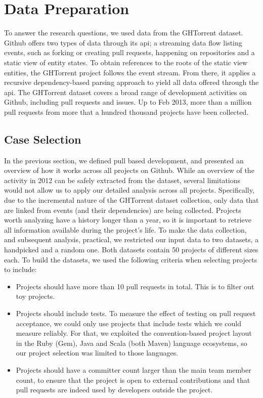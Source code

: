 \documentclass{sig-alternate}
\begin{document}
\section{Data Preparation}

To answer the research questions, we used data from the GHTorrent dataset.
Github offers two types of data through its {\sc api}; a streaming data flow
listing events, such as forking or creating pull requests, happening on
repositories and a static view of entity states. To obtain references to the
roots of the static view entities, the GHTorrent project follows the event
stream. From there, it applies a recursive dependency-based parsing approach to
yield all data offered through the {\sc api}. The GHTorrent dataset covers a
broad range of development activities on Github, including pull requests and
issues. Up to Feb 2013, more than a million pull requests from more that a
hundred thousand projects have been collected.

\subsection{Case Selection}
\label{sec:caseselection}
In the previous section, we defined pull based development, and presented an
overview of how it works across all projects on Github. While an overview of
the activity in 2012 can be safely extracted from the dataset, several
limitations would not allow us to apply our detailed analysis across all
projects. Specifically, due to the incremental nature of the GHTorrent dataset
collection, only data that are linked from events (and their dependencies) are
being collected. Projects worth analyzing have a history longer than a year, so
it is important to retrieve all information available during the project's
life. To make the data collection, and subsequent analysis, practical, we
restricted our input data to two datasets, a \textsf{handpicked} and a
\textsf{random} one. Both datasets contain 50 projects of different sizes
each. To build the datasets, we used the following criteria when selecting
projects to include:

\begin{itemize}

  \item Projects should have more than 10 pull requests in total. This is
    to filter out toy projects. 

  \item Projects should include tests. To measure the effect of testing on pull
    request acceptance, we could only use projects that include tests which we
    could measure reliably. For that, we exploited the convention-based project
    layout in the Ruby (Gem), Java and Scala (both Maven) language ecosystems,
    so our project selection was limited to those languages. 

  \item Projects should have a committer count larger than the main team member
    count, to ensure that the project is open to external contributions and that
    pull requests are indeed used by developers outside the project.

\end{itemize}
\end{document}
